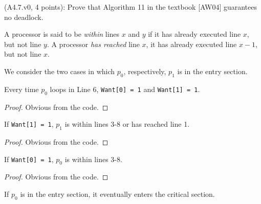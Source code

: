 \begin{Exc}{(A4.7.v0, 4 points):}
Prove that Algorithm 11 in the textbook [AW04] guarantees no deadlock.
\end{Exc}

\begin{definition}
A processor is said to be \emph{within} lines $x$ and $y$ if it has already 
executed line $x$, but not line $y$. A processor \emph{has reached} line $x$,
it has already executed line $x-1$, but not line $x$.
\end{definition}


We consider the two cases in which $p_0$, respectively, $p_1$
is in the entry section.

\begin{lemma} \label{lemma:1.p0loop}
Every time $p_0$ loops in Line 6, \lstinline|Want[0] = 1| and \lstinline|Want[1] = 1|.
\end{lemma}

\begin{proof}
Obvious from the code.
\end{proof}

\begin{lemma} \label{lemma:1.want1}
If \lstinline|Want[1] = 1|, $p_1$ is within lines 3-8 or has reached line 1.
\end{lemma}

\begin{proof}
Obvious from the code.
\end{proof}

\begin{lemma} \label{lemma:1.want0}
If \lstinline|Want[0] = 1|, $p_0$ is within lines 3-8.
\end{lemma}

\begin{proof}
Obvious from the code.
\end{proof}

\begin{lemma} \label{lemma:1.p0}
If $p_0$ is in the entry section, it eventually enters the critical section.
\end{lemma}

